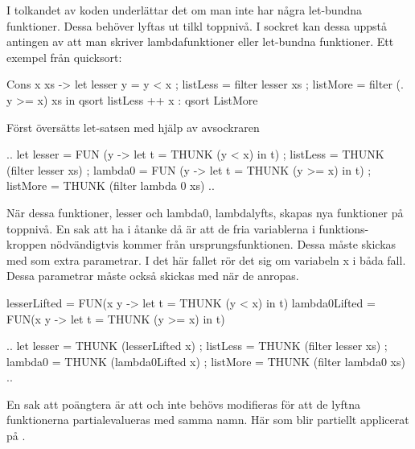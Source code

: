 \documentclass[../Core]{subfiles}
\begin{document}
I tolkandet av koden underlättar det om man inte har några let-bundna funktioner.
Dessa behöver lyftas ut tilkl toppnivå. I sockret kan dessa uppstå antingen
av att man skriver lambdafunktioner eller let-bundna funktioner. Ett exempel
från quicksort:

\begin{codeEx}
  Cons x xs ->
      let { lesser y = y < x
          ; listLess = filter lesser xs
          ; listMore = filter (\y . y >= x) xs
          }
      in  qsort listLess ++ x : qsort ListMore
\end{codeEx}

Först översätts let-satsen med hjälp av avsockraren

\begin{codeEx}
  .. let { lesser = FUN (y -> let t = THUNK (y < x) in t)
         ; listLess = THUNK (filter lesser xs)
         ; lambda0 = FUN (y -> let t = THUNK (y >= x) in t)
         ; listMore = THUNK (filter lambda 0 xs)
         } ..
\end{codeEx}
      
När dessa funktioner, lesser och lambda0, lambdalyfts, skapas nya funktioner
på toppnivå. En sak att ha i åtanke då är att de fria variablerna i funktions-
kroppen nödvändigtvis kommer från ursprungsfunktionen. Dessa måste skickas med
som extra parametrar. I det här fallet rör det sig om variabeln x i båda fall.
Dessa parametrar måste också skickas med när de anropas.

\begin{codeEx}
lesserLifted = FUN(x y -> let t = THUNK (y < x) in t)
lambda0Lifted = FUN(x y -> let t = THUNK (y >= x) in t)

    .. let { lesser = THUNK (lesserLifted x)
           ; listLess = THUNK (filter lesser xs)
           ; lambda0 = THUNK (lambda0Lifted x)
           ; listMore = THUNK (filter lambda0 xs)
           } ..
\end{codeEx}

En sak att poängtera är att  och  
inte behövs modifieras för att de lyftna funktionerna partialevalueras 
med samma namn. Här  som blir 
partiellt applicerat på .
\end{document}
